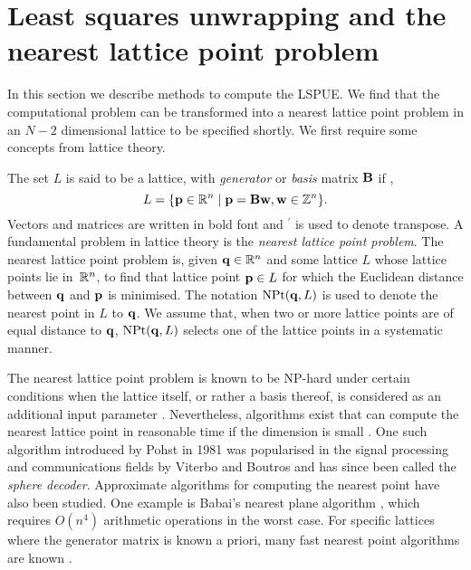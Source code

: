 \section{Least squares unwrapping and the nearest lattice point problem} \label{sec:LSPUandNP}

In this section we describe methods to compute the LSPUE.  We find that the
computational problem can be transformed into a nearest lattice point problem
\cite{Agrell2002} in an $N-2$ dimensional lattice to be specified shortly.  
We first require some concepts from lattice theory.

The set $L$ is said to be a lattice, with \emph{generator} or \emph{basis} matrix  $\mathbf{B}$ if \cite{SPLAG},
\[ 
  L = \{\mathbf{p} \in {\mathbb R}^n \;|\; \mathbf{p} = \mathbf{B}\mathbf{w} , \mathbf{w} \in {\mathbb Z}^n \}.
\]
Vectors and matrices are written in bold font and 
${}^{\prime}$ is used to denote transpose. A fundamental problem in lattice theory is
the \emph{nearest lattice point problem}. The nearest lattice point problem
is, given $\mathbf{q}\in{\mathbb R}^n$ and some lattice $L$ whose lattice points lie
in~${\mathbb R}^n$, to find that lattice point $\mathbf{p} \in L$ for which the Euclidean
distance between $\mathbf{q}$ and $\mathbf{p}$ is minimised.  The notation
$\operatorname{NPt}(\mathbf{q}, L)$ is used to denote the nearest point in $L$ to $\mathbf{q}$.  We
assume that, when two or more lattice points are of equal distance to $\mathbf{q}$, $\operatorname{NPt}(\mathbf{q}, L)$
selects one of the lattice points in a systematic manner.

The nearest lattice point problem is known to be NP-hard under certain conditions when the lattice itself, or rather a basis thereof, is considered as an additional input parameter \cite{micciancio_hardness_2001, AjtaiShortestVecProbNPHard1998, Jalden2005_sphere_decoding_complexity}. Nevertheless, algorithms exist that can compute the nearest lattice point in reasonable time if the dimension is small
\cite{Agrell2002, Viterbo_sphere_decoder_1999, Pohst_sphere_decoder_1981}. One
such algorithm introduced by Pohst \cite{Pohst_sphere_decoder_1981} in 1981
was popularised in the signal processing and communications fields by Viterbo
and Boutros \cite{Viterbo_sphere_decoder_1999} and has since been called the
\emph{sphere decoder}. Approximate algorithms for computing the nearest point
have also been studied.  One example is Babai's nearest plane algorithm
\cite{Babai1986}, which requires $O(n^4)$ arithmetic operations in the worst
case.  For specific lattices where the generator matrix is known a priori,
many fast nearest point algorithms are known \cite{Conway1982FastQuantDec,
  Conway1986SoftDecLeechGolay, Clarkson1999:Anstar, McKilliam2008,
  McKilliam2008b, McKilliam2009CoxeterLattices}.

